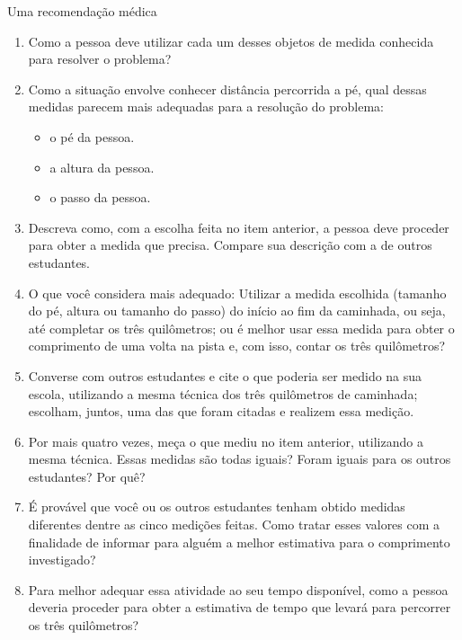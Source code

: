 \begin{task}{Uma recomendação médica}
\begin{enumerate}
\item {} 
Como a pessoa deve utilizar cada um desses objetos de medida conhecida para resolver o problema?

\item {} 
Como a situação envolve conhecer distância percorrida a pé, qual dessas medidas parecem mais adequadas para a resolução do problema:

\begin{itemize}
\item o pé da pessoa.
\item a altura da pessoa.
\item o passo da pessoa.
\end{itemize}

\item {} 
Descreva como, com a escolha feita no item anterior, a pessoa deve proceder para obter a medida que precisa. Compare sua descrição com a de outros estudantes.

\item {} 
O que você considera mais adequado: Utilizar a medida escolhida (tamanho do pé, altura ou tamanho do passo) do início ao fim da caminhada, ou seja, até completar os três quilômetros; ou é melhor usar essa medida para obter o comprimento de uma volta na pista e, com isso, contar os três quilômetros?

\item {} 
Converse com outros estudantes e cite o que poderia ser medido na sua escola, utilizando a mesma técnica dos três quilômetros de caminhada; escolham, juntos, uma das que foram citadas e realizem essa medição.

\item {} 
Por mais quatro vezes, meça o que mediu no item anterior, utilizando a mesma técnica. Essas medidas são todas iguais? Foram iguais para os outros estudantes? Por quê?

\item {} 
É provável que você ou os outros estudantes tenham obtido medidas diferentes dentre as cinco medições feitas. Como tratar esses valores com a finalidade de informar para alguém a melhor estimativa para o comprimento investigado?

\item {} 
Para melhor adequar essa atividade ao seu tempo disponível, como a pessoa deveria proceder para obter a estimativa de tempo que levará para percorrer os três quilômetros?

\end{enumerate}
\end{task}


